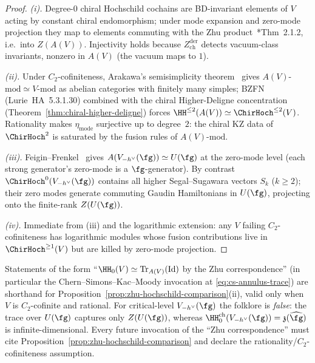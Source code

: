 \begin{proof}
\emph{(i).} Degree-$0$ chiral Hochschild cochains are BD-invariant
elements of $V$ acting by constant chiral endomorphism; under mode
expansion and zero-mode projection they map to elements commuting
with the Zhu product~\cite{Zhu96}*{Thm~2.1.2}, i.e.\ into $Z(A(V))$.
Injectivity holds because $Z^{\mathrm{der}}_{\mathrm{ch}}$ detects
vacuum-class invariants, nonzero in $A(V)$ (the vacuum maps to $1$).

\emph{(ii).} Under $C_2$-cofiniteness, Arakawa's semisimplicity
theorem~\cite{Arakawa15} gives $A(V)$-$\mathrm{mod}\simeq V$-$\mathrm{mod}$
as abelian categories with finitely many simples; BZFN
(Lurie~HA~5.3.1.30) combined with the chiral Higher-Deligne
concentration (Theorem~\ref{thm:chiral-higher-deligne}) forces
$\HH^{\le 2}(A(V))\simeq \ChirHoch^{\le 2}(V)$. Rationality makes
$\eta_{\mathrm{mode}}$ surjective up to degree~$2$: the chiral KZ data
of $\ChirHoch^2$ is saturated by the fusion rules of $A(V)$-$\mathrm{mod}$.

\emph{(iii).} Feigin--Frenkel~\cite{FF92} gives
$A(V_{-h^\vee}(\fg))\simeq U(\fg)$ at the zero-mode level (each
strong generator's zero-mode is a $\fg$-generator). By contrast
$\ChirHoch^0(V_{-h^\vee}(\fg))$ contains all higher Segal--Sugawara
vectors $S_k$ ($k\ge 2$); their zero modes generate commuting Gaudin
Hamiltonians in $U(\fg)$, projecting onto the finite-rank $Z(U(\fg))$.

\emph{(iv).} Immediate from (iii) and the logarithmic extension: any
$V$ failing $C_2$-cofiniteness has logarithmic modules whose fusion
contributions live in $\ChirHoch^{\ge 1}(V)$ but are killed by
zero-mode projection.
\end{proof}

\begin{remark}%
\label{rem:zhu-folklore-recode}%
Statements of the form ``$\HH_0(V)\simeq \mathrm{Tr}_{A(V)}(\mathrm{Id})$
by the Zhu correspondence'' (in particular the Chern--Simons--Kac--Moody
invocation at \eqref{eq:cs-annulus-trace}) are shorthand for
Proposition~\ref{prop:zhu-hochschild-comparison}(ii), valid only when
$V$ is $C_2$-cofinite and rational. For critical-level
$V_{-h^\vee}(\fg)$ the folklore is \emph{false}: the trace over
$U(\fg)$ captures only $Z(U(\fg))$, whereas
$\HH^{\mathrm{ch}}_0(V_{-h^\vee}(\fg))=\mathfrak{z}(\widehat{\fg})$
is infinite-dimensional. Every future invocation of the ``Zhu
correspondence'' must cite Proposition~\ref{prop:zhu-hochschild-comparison}
and declare the rationality/$C_2$-cofiniteness assumption.
\end{remark}

